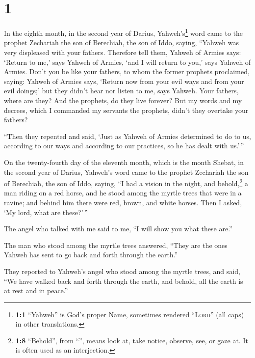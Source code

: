 \hypertarget{section}{%
\section{1}\label{section}}

 In the eighth month, in the second year of Darius,
Yahweh's\footnote{\textbf{1:1} ``Yahweh'' is God's proper Name,
  sometimes rendered ``\textsc{Lord}'' (all caps) in other translations.}
word came to the prophet Zechariah the son of Berechiah, the son of
Iddo, saying,  ``Yahweh was very displeased with your
fathers.  Therefore tell them, Yahweh of Armies says:
`Return to me,' says Yahweh of Armies, `and I will return to you,' says
Yahweh of Armies.  Don't you be like your fathers, to whom
the former prophets proclaimed, saying: Yahweh of Armies says, `Return
now from your evil ways and from your evil doings;' but they didn't hear
nor listen to me, says Yahweh.  Your fathers, where are
they? And the prophets, do they live forever?  But my
words and my decrees, which I commanded my servants the prophets, didn't
they overtake your fathers?

``Then they repented and said, `Just as Yahweh of Armies determined to
do to us, according to our ways and according to our practices, so he
has dealt with us.'\,''

 On the twenty-fourth day of the eleventh month, which is
the month Shebat, in the second year of Darius, Yahweh's word came to
the prophet Zechariah the son of Berechiah, the son of Iddo, saying,
 ``I had a vision in the night, and behold,\footnote{\textbf{1:8}
  ``Behold'', from ``'', means look at, take notice,
  observe, see, or gaze at. It is often used as an interjection.} a man
riding on a red horse, and he stood among the myrtle trees that were in
a ravine; and behind him there were red, brown, and white horses.
 Then I asked, `My lord, what are these?'\,''

The angel who talked with me said to me, ``I will show you what these
are.''

 The man who stood among the myrtle trees answered,
``They are the ones Yahweh has sent to go back and forth through the
earth.''

 They reported to Yahweh's angel who stood among the
myrtle trees, and said, ``We have walked back and forth through the
earth, and behold, all the earth is at rest and in peace.''


